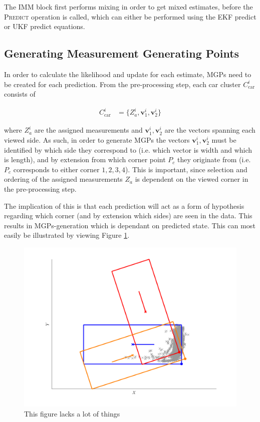 The \textsc{IMM} block first performs mixing in order to get mixed estimates, before the \textsc{Predict} operation is called, which can either be performed using the EKF predict or UKF predict equations. 

\subsection{Generating Measurement Generating Points}

In order to calculate the likelihood and update for each estimate, MGPs need to be created for each prediction. From the pre-processing step, each car cluster $C_{\text{car}}^{i}$ consists of 

\begin{equation}
    \begin{split}
        C_{\text{car}}^{i} &= \{Z^i_a, \mathbf{v}_{1}^i, \mathbf{v}_{2}^i\}
    \end{split}
\end{equation}

where $Z^i_a$ are the assigned measurements and $\mathbf{v}_{1}^i, \mathbf{v}_{2}^i$ are the vectors spanning each viewed side. As such, in order to generate MGPs the vectors $\mathbf{v}_{1}^i, \mathbf{v}_{2}^i$ must be identified by which side they correspond to (i.e. which vector is width and which is length), and by extension from which corner point $P_c$ they originate from (i.e. $P_c$ corresponds to either corner $1,2,3,4$). This is important, since selection and ordering of the assigned measurements $Z_a$ is dependent on the viewed corner in the pre-processing step.

The implication of this is that each prediction will act as a form of hypothesis regarding which corner (and by extension which sides) are seen in the data. This results in MGPs-generation which is dependant on predicted state. This can most easily be illustrated by viewing Figure \ref{fig:diffPred}.

\begin{figure}[ht]
    \centering
    \includegraphics[width = 0.5\linewidth]{include/images/diffPred.png}
    \caption{This figure lacks a lot of things}
    \label{fig:diffPred}
\end{figure}

